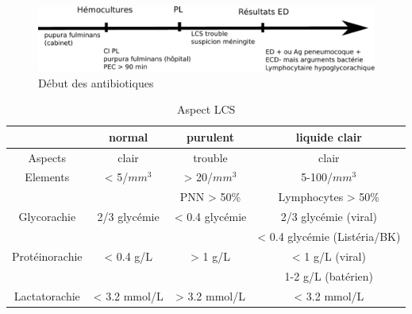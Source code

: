 \documentclass{article}
\begin{document}
\begin{figure}[htpb]
  \centering
  \begin{minipage}{0.42\textwidth}
  \end{minipage}
  \begin{minipage}{0.69\textwidth}
  \end{minipage}
\end{figure}

\begin{figure}[htpb]
  \centering
  \includegraphics[width=0.8\linewidth]{../../pictures/medecine/148_antibio}
  \caption{Début des antibiotiques}
\end{figure}

\begin{table}[htpb]
  \centering
  \caption{Aspect LCS}
  
  \begin{tabular}{*{4}{c}}
    \toprule
    &normal & purulent & liquide clair \\
    \midrule
    Aspects & clair & trouble & clair \\
    Elements & < 5/\(mm^3\) & > 20/\(mm^3\)  & 5-100/\(mm^3\)
    \\
    & & PNN > 50\% & Lymphocytes > 50\% \\
    Glycorachie & 2/3 glycémie & < 0.4 glycémie & 2/3 glycémie (viral)\\
    & & & < 0.4 glycémie (Listéria/BK) \\
    \midrule
    Protéinorachie & < 0.4 g/L & > 1 g/L & < 1 g/L (viral)\\
    & & & 1-2 g/L (batérien) \\
    Lactatorachie & < 3.2 mmol/L & > 3.2 mmol/L & <
    3.2 mmol/L \\
    \bottomrule
  \end{tabular}
\end{table}
\end{document}
